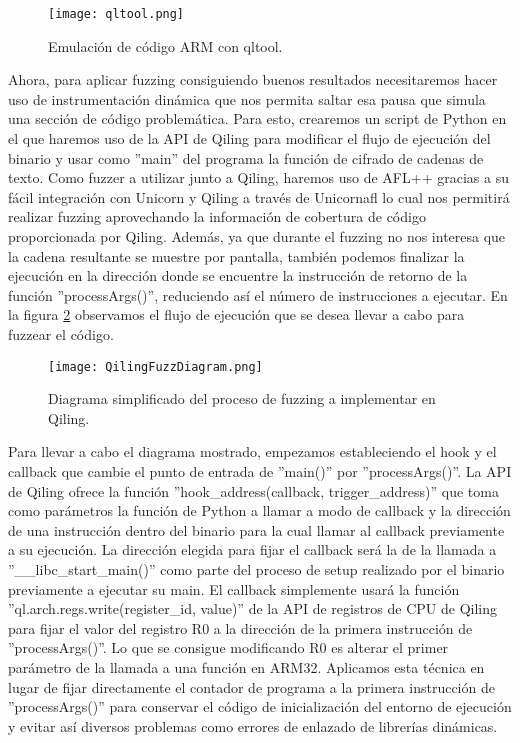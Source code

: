 \begin{figure}[H]
    \centering
    \texttt{[image: qltool.png]}
    \caption{Emulación de código ARM con qltool.}
    \label{fig:qltool}
\end{figure}

Ahora, para aplicar fuzzing consiguiendo buenos resultados necesitaremos hacer uso de instrumentación dinámica que nos permita saltar esa pausa que 
simula una sección de código problemática. Para esto, crearemos un script de Python en el que haremos uso de la API de Qiling para modificar
el flujo de ejecución del binario y usar como ''main'' del programa la función de cifrado de cadenas de texto. Como fuzzer a utilizar junto a Qiling, 
haremos uso de AFL++ gracias a su fácil integración con Unicorn y Qiling a través de Unicornafl lo cual nos permitirá realizar fuzzing aprovechando la 
información de cobertura de código proporcionada por Qiling. Además, ya que durante el fuzzing 
no nos interesa que la cadena resultante se muestre por pantalla, también podemos finalizar la ejecución en la dirección donde se encuentre la instrucción
de retorno de la función ''processArgs()'', reduciendo así el número de instrucciones a ejecutar. En la figura \ref{fig:QilingFuzzDiagram} observamos el
flujo de ejecución que se desea llevar a cabo para fuzzear el código.

\begin{figure}[H]
    \centering
    \texttt{[image: QilingFuzzDiagram.png]}
    \caption{Diagrama simplificado del proceso de fuzzing a implementar en Qiling.}
    \label{fig:QilingFuzzDiagram}
\end{figure}

Para llevar a cabo el diagrama mostrado, empezamos estableciendo el hook y el callback que cambie el punto de entrada de ''main()'' por ''processArgs()''.
La API de Qiling ofrece la función ''hook\_address(callback, trigger\_address)'' que toma como parámetros la función de Python a llamar a modo de callback 
y la dirección de una instrucción dentro del binario para la cual llamar al callback previamente a su ejecución. La dirección elegida para fijar el callback 
será la de la llamada a ''\_\_libc\_start\_main()'' como parte del proceso de setup realizado por el binario previamente a ejecutar su main. El callback
simplemente usará la función ''ql.arch.regs.write(register\_id, value)'' de la API de registros de CPU de Qiling para fijar el valor del registro R0 a la dirección de la primera 
instrucción de ''processArgs()''. Lo que se consigue modificando R0 es alterar el primer parámetro de la llamada a una función en ARM32. Aplicamos esta
técnica en lugar de fijar directamente el contador de programa a la primera instrucción de ''processArgs()'' para conservar el código 
de inicialización del entorno de ejecución y evitar así diversos problemas como errores de enlazado de librerías dinámicas.\bigskip

